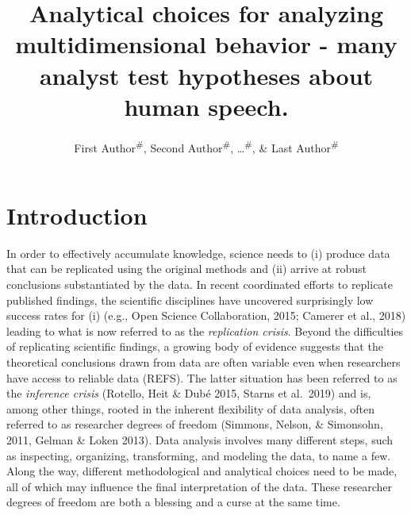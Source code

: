 \documentclass[
  english,
  man]{apa6}
\title{Analytical choices for analyzing multidimensional behavior - many analyst test hypotheses about human speech.}
\author{First Author\textsuperscript{\#}, Second Author\textsuperscript{\#}, \ldots{}\textsuperscript{\#}, \& Last Author\textsuperscript{\#}}
\date{}
\affiliation{\vspace{0.5cm}\textsuperscript{1} \#\\\textsuperscript{\ldots{}} \ldots{}}
\begin{document}
\maketitle

\hypertarget{introduction}{%
\section{Introduction}\label{introduction}}

In order to effectively accumulate knowledge, science needs to (i) produce data that can be replicated using the original methods and (ii) arrive at robust conclusions substantiated by the data.
In recent coordinated efforts to replicate published findings, the scientific disciplines have uncovered surprisingly low success rates for (i) (e.g., Open Science Collaboration, 2015; Camerer et al., 2018) leading to what is now referred to as the \emph{replication crisis}.
Beyond the difficulties of replicating scientific findings, a growing body of evidence suggests that the theoretical conclusions drawn from data are often variable even when researchers have access to reliable data (REFS).
The latter situation has been referred to as the \emph{inference crisis} (Rotello, Heit \& Dubé 2015, Starns et al.~2019) and is, among other things, rooted in the inherent flexibility of data analysis, often referred to as researcher degrees of freedom (Simmons, Nelson, \& Simonsohn, 2011, Gelman \& Loken 2013).
Data analysis involves many different steps, such as inspecting, organizing, transforming, and modeling the data, to name a few.
Along the way, different methodological and analytical choices need to be made, all of which may influence the final interpretation of the data.
These researcher degrees of freedom are both a blessing and a curse at the same time.
\end{document}
